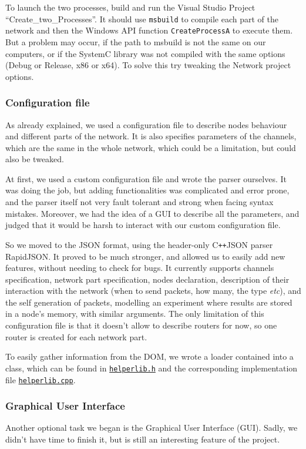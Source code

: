 \documentclass[12pt,a4paper]{article}
\newcommand{\Cpp}{C\texttt{++}}
\begin{document}
To launch the two processes, build and run the Visual Studio Project ``Create\_two\_Processes''. It should use \texttt{msbuild} to compile each part of the network and then the Windows API function \texttt{CreateProcessA} to execute them. But a problem may occur, if the path to msbuild is not the same on our computers, or if the SystemC library was not compiled with the same options (Debug or Release, x86 or x64). To solve this try tweaking the Network project options.
\subsubsection*{Configuration file}
As already explained, we used a configuration file to describe nodes behaviour and different parts of the network. It is also specifies parameters of the channels, which are the same in the whole network, which could be a limitation, but could also be tweaked.

At first, we used a custom configuration file and wrote the parser ourselves. It was doing the job, but adding functionalities was complicated and error prone, and the parser itself not very fault tolerant and strong when facing syntax mistakes. Moreover, we had the idea of a GUI to describe all the parameters, and judged that it would be harsh to interact with our custom configuration file.

So we moved to the JSON format, using the header-only \Cpp JSON parser RapidJSON. It proved to be much stronger, and allowed us to easily add new features, without needing to check for bugs. It currently supports channels specification, network part specification, nodes declaration, description of their interaction with the network (when to send packets, how many, the type \textsl{etc}), and the self generation of packets, modelling an experiment where results are stored in a node's memory, with similar arguments. The only limitation of this configuration file is that it doesn't allow to describe routers for now, so one router is created for each network part. 

To easily gather information from the DOM, we wrote a loader contained into a class, which can be found in \href{https://github.com/suai-ipsa2018/ExoMars2020/blob/master/ExoMars2020/Network/helperlib.h}{\texttt{helperlib.h}} and the corresponding implementation file \href{https://github.com/suai-ipsa2018/ExoMars2020/blob/master/ExoMars2020/Network/helperlib.cpp}{\texttt{helperlib.cpp}}.

\subsubsection*{Graphical User Interface}
Another optional task we began is the Graphical User Interface (GUI). Sadly, we didn't have time to finish it, but is still an interesting feature of the project.
\end{document}
